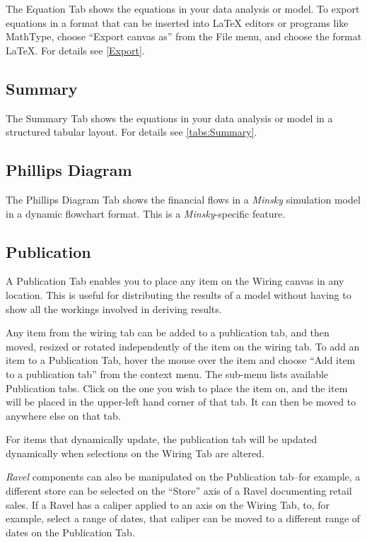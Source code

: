 The Equation Tab shows the equations in your data analysis or model.
To export equations in a format that can be inserted into \LaTeX{} editors
or programs like MathType, choose ``Export canvas as'' from the
File menu, and choose the format LaTeX. For details see \ref{Export}.

\subsection{Summary}

The Summary Tab shows the equations in your data analysis or model
in a structured tabular layout. For details see \ref{tabs:Summary}.

\subsection{Phillips Diagram}

The Phillips Diagram Tab shows the financial flows in a \emph{Minsky}
simulation model in a dynamic flowchart format. This is a \emph{Minsky}-specific
feature.

\subsection{Publication }

\label{tabs:Publication}

A Publication Tab enables you to place any item on the Wiring canvas
in any location. This is useful for distributing the results of a
model without having to show all the workings involved in deriving
results.

Any item from the wiring tab can be added to a publication tab, and
then moved, resized or rotated independently of the item on the wiring
tab. To add an item to a Publication Tab, hover the mouse over the
item and choose ``Add item to a publication tab'' from the context
menu. The sub-menu lists available Publication tabs. Click on the
one you wish to place the item on, and the item will be placed in
the upper-left hand corner of that tab. It can then be moved to anywhere
else on that tab.

For items that dynamically update, the publication tab will be updated
dynamically when selections on the Wiring Tab are altered.

\emph{Ravel} components can also be manipulated on the Publication
tab--for example, a different store can be selected on the ``Store''
axis of a Ravel documenting retail sales. If a Ravel has a caliper
applied to an axis on the Wiring Tab, to, for example, select a range
of dates, that caliper can be moved to a different range of dates
on the Publication Tab.

